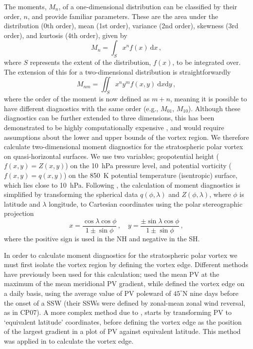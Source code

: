 The moments, $M_{n}$, of a one-dimensional distribution can be classified by
their order, $n$, and provide familiar parameters. These are the area under the
distribution (0th order), mean (1st order), variance (2nd order), skewness (3rd
order), and kurtosis (4th order), given by
\begin{equation}
M_{n} = \int_{S} x^{n}f(x)~\mathrm{d}x \, ,
\end{equation}
where $S$ represents the extent of the distribution, $f(x)$, to be integrated
over. The extension of this for a two-dimensional distribution is
straightforwardly
\begin{equation}
M_{nm} = \iint_{S} x^{n}y^{m}f(x,y)~\mathrm{d}x\mathrm{d}y \, ,
\label{eq:2D_moment}
\end{equation}
where the order of the moment is now defined as $m+n$, meaning it is possible to
have different diagnostics with the same order (e.g., $M_{01}$,
$M_{10}$). Although these diagnostics can be further extended to three
dimensions, this has been demonstrated to be highly computationally expensive
\citep{Li1994}, and would require assumptions about the lower and upper bounds
of the vortex region. We therefore calculate two-dimensional moment diagnostics
for the stratospheric polar vortex on quasi-horizontal surfaces. We use two
variables; geopotential height ($f(x,y) = Z(x,y)$) on the 10~hPa pressure level,
and potential vorticity ($f(x,y) = q(x,y)$) on the 850~K potential temperature
(isentropic) surface, which lies close to 10~hPa. Following \citet{Waugh1997},
the calculation of moment diagnostics is simplified by transforming the
spherical data $q(\phi,\lambda)$ and $Z(\phi,\lambda)$, where $\phi$ is latitude
and $\lambda$ longitude, to Cartesian coordinates using the polar stereographic
projection
\begin{equation}
x = \frac{\cos\lambda\cos\phi}{1 \pm \sin\phi}\, , \quad
y = \frac{\pm\sin\lambda\cos\phi}{1 \pm \sin\phi}\, , 
\end{equation}  
where the positive sign is used in the NH and negative in the
SH.

In order to calculate moment diagnostics for the stratospheric polar vortex we
must first isolate the vortex region by defining the vortex edge. Different
methods have previously been used for this calculation; \citet{Waugh1999} used
the mean PV at the maximum of the mean meridional PV gradient, while
\citet{Matthewman2009} defined the vortex edge on a daily basis, using the
average value of PV poleward of $45^{\circ}$N nine days before the onset of a
SSW (their SSWs were defined by zonal-mean zonal wind reversal, as in CP07). A
more complex method due to \citet{Nash1996}, starts by transforming PV to
`equivalent latitude' \citep{Butchart1986} coordinates, before defining the
vortex edge as the position of the largest gradient in a plot of PV against
equivalent latitude. This method was applied in \citet{Mitchell2011} to
calculate the vortex edge. 

